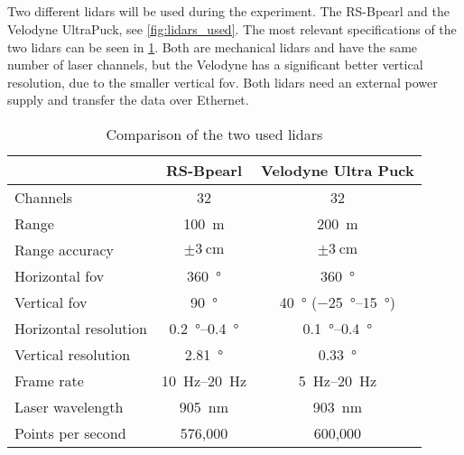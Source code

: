 \subsection{}
Two different \gls{lidar}s will be used during the experiment.
The RS-Bpearl and the Velodyne UltraPuck, see \cref{fig:lidars_used}.
The most relevant specifications of the two \gls{lidar}s can be seen in \cref{tab:lidar_datasheets}.
Both are mechanical \gls{lidar}s and have the same number of laser channels, but the Velodyne has a significant better vertical resolution, due to the smaller vertical \gls{fov}.
Both \gls{lidar}s need an external power supply and transfer the data over Ethernet.
\begin{table}[ht]
	\centering
	\caption{Comparison of the two used \acrshort{lidar}s \cite{RoboSense2020, Velodyne2018}}
	\label{tab:lidar_datasheets}
	\begin{tabular}[t]{lcc}
		\toprule
		                      & \textbf{RS-Bpearl}          & \textbf{Velodyne Ultra Puck}                  \\
		\midrule
		Channels              & 32                          & 32                                            \\
		Range                 & \SI{100}{\metre}            & \SI{200}{\metre}                              \\
		Range accuracy        & $\pm\SI{3}{\centi\metre}$   & $\pm\SI{3}{\centi\metre}$                     \\
		Horizontal \gls{fov}  & \SI{360}{\degree}           & \SI{360}{\degree}                             \\
		Vertical \gls{fov}    & \SI{90}{\degree}            & \SI{40}{\degree} (\SIrange{-25}{15}{\degree}) \\
		Horizontal resolution & \SIrange{0.2}{0.4}{\degree} & \SIrange{0.1}{0.4}{\degree}                   \\
		Vertical resolution   & \SI{2.81}{\degree}          & \SI{0.33}{\degree}                            \\
		Frame rate            & \SIrange{10}{20}{\hertz}    & \SIrange{5}{20}{\hertz}                       \\
		Laser wavelength      & \SI{905}{\nano\metre}       & \SI{903}{\nano\metre}                         \\
		Points per second     & 576,000                     & 600,000                                       \\
		\bottomrule
	\end{tabular}
\end{table}%
